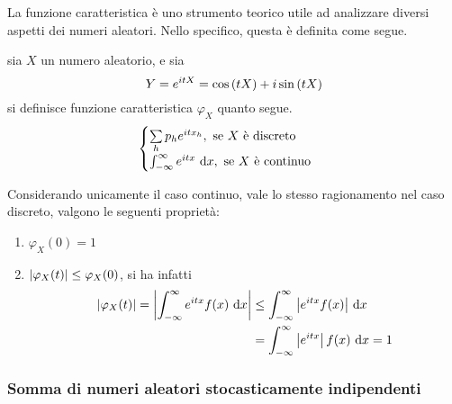 \documentclass{subfiles}
\begin{document}
La funzione caratteristica è uno strumento teorico utile ad analizzare diversi aspetti dei numeri aleatori.
Nello specifico, questa è definita come segue.
\begin{Definition*}
    sia \(X\) un numero aleatorio, e sia
    \[
        Y = e^{itX} = \Cos{tX} + i\Sin{tX}
    \]
    si definisce funzione caratteristica \(\varphi_{X}\) quanto segue.
    \[\begin{cases}
            \Sum{p_{h} e^{itx_{h}}}{h}, \text{se} X \text{è discreto} \\
            \Int{e^{itx}}{x}[-\infty][\infty], \text{se} X \text{è continuo}
        \end{cases}\]
\end{Definition*}

Considerando unicamente il caso continuo, vale lo stesso ragionamento nel caso discreto, valgono le seguenti proprietà:
\begin{enumerate}
    \item \(\varphi_{X}(0) = 1\)
    \item \(\left\vert {\varphi_{X}(t)} \right\vert \le \varphi_{X}(0)\), si ha infatti
          \[\begin{aligned}
                  \Abs{\varphi_{X}(t)} = \Abs{\Int{e^{itx} f(x)}{x}[-\infty][\infty]} & \le \Int{\Abs{e^{itx} f(x)}}{x}[-\infty][\infty]   \\
                                                                                      & = \Int{\Abs{e^{itx}} f(x)}{x}[-\infty][\infty] = 1
              \end{aligned}\]
\end{enumerate}

\subsubsection{Somma di numeri aleatori stocasticamente indipendenti}

\end{document}
